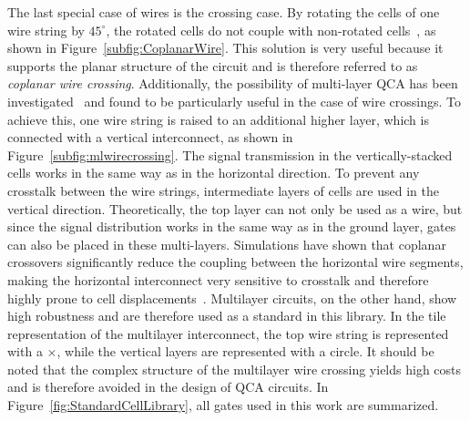 The last special case of wires is the crossing case. By rotating the cells of one wire string by $45^{\circ}$, the rotated cells do not couple with non-rotated cells~\cite{Inverter_displacements}, as shown in Figure~\ref{subfig:CoplanarWire}. This solution is very useful because it supports the planar structure of the circuit and is therefore referred to as \textit{coplanar wire crossing}. Additionally, the possibility of multi-layer QCA has been investigated~\cite{multi_lyer_wire_crossing} and found to be particularly useful in the case of wire crossings. To achieve this, one wire string is raised to an additional higher layer, which is connected with a vertical interconnect, as shown in Figure~\ref{subfig:mlwirecrossing}. The signal transmission in the vertically-stacked cells works in the same way as in the horizontal direction. To prevent any crosstalk between the wire strings, intermediate layers of cells are used in the vertical direction. Theoretically, the top layer can not only be used as a wire, but since the signal distribution works in the same way as in the ground layer, gates can also be placed in these multi-layers. Simulations have shown that coplanar crossovers significantly reduce the coupling between the horizontal wire segments, making the horizontal interconnect very sensitive to crosstalk and therefore highly prone to cell displacements~\cite{Inverter_displacements}. Multilayer circuits, on the other hand, show high robustness and are therefore used as a standard in this library. In the tile representation of the multilayer interconnect, the top wire string is represented with a $\times$, while the vertical layers are represented with a circle. It should be noted that the complex structure of the multilayer wire crossing yields high costs and is therefore avoided in the design of QCA circuits. In Figure~\ref{fig:StandardCellLibrary}, all gates used in this work are summarized.

